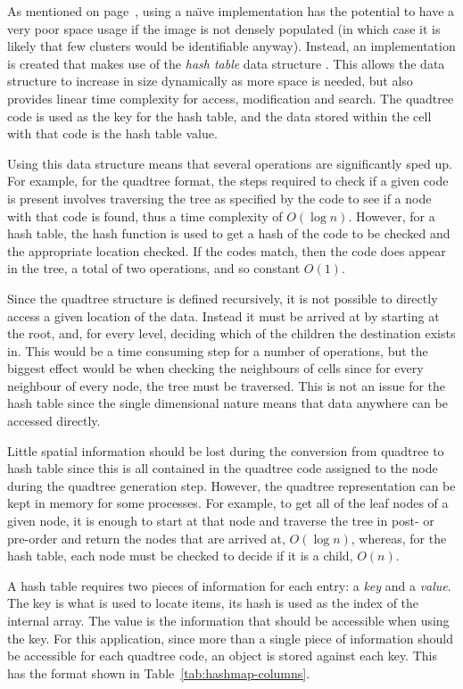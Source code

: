 As mentioned on page~\pageref{prt:custom_algorithm}, using a na\"{\i}ve
implementation has the potential to have a very poor space usage if the image
is not densely populated (in which case it is likely that few clusters would be
identifiable anyway). Instead, an implementation is created that makes use of
the \emph{hash table} data structure \cite{cormen2001introduction}. This allows
the data structure to increase in size dynamically as more space is needed, but
also provides linear time complexity for access, modification and search. The
quadtree code is used as the key for the hash table, and the data stored within
the cell with that code is the hash table value.

Using this data structure means that several operations are significantly sped
up. For example, for the quadtree format, the steps required to check if a
given code is present involves traversing the tree as specified by the code to
see if a node with that code is found, thus a time complexity of $O(\log n)$.
However, for a hash table, the hash function is used to get a hash of the code
to be checked and the appropriate location checked. If the codes match, then
the code does appear in the tree, a total of two operations, and so constant
$O(1)$.

Since the quadtree structure is defined recursively, it is not possible to
directly access a given location of the data. Instead it must be arrived at by
starting at the root, and, for every level, deciding which of the children the
destination exists in. This would be a time consuming step for a number of
operations, but the biggest effect would be when checking the neighbours of
cells since for every neighbour of every node, the tree must be traversed. This
is not an issue for the hash table since the single dimensional nature means
that data anywhere can be accessed directly.

Little spatial information should be lost during the conversion from quadtree
to hash table since this is all contained in the quadtree code assigned to the
node during the quadtree generation step. However, the quadtree representation
can be kept in memory for some processes. For example, to get all of the leaf
nodes of a given node, it is enough to start at that node and traverse the tree
in post- or pre-order and return the nodes that are arrived at, $O(\log n)$,
whereas, for the hash table, each node must be checked to decide if it is a
child, $O(n)$.

A hash table requires two pieces of information for each entry: a \emph{key}
and a \emph{value}. The key is what is used to locate items, its hash is used
as the index of the internal array. The value is the information that should be
accessible when using the key. For this application, since more than a single
piece of information should be accessible for each quadtree code, an object is
stored against each key. This has the format shown in
Table~\ref{tab:hashmap-columns}.

